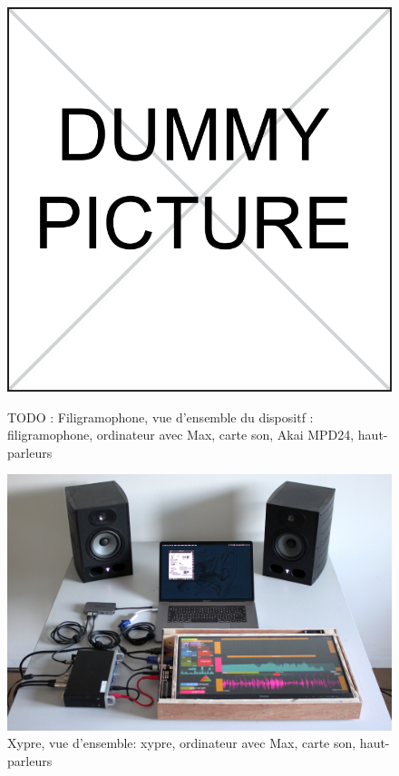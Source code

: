 \begin{figure}[!htbp]
	\captionsetup{format=plain}%
	\centering
	\begin{minipage}[t]{0.48\textwidth}
		\includegraphics[width=\linewidth]{gfx/dummy.pdf}
		\caption[Filigramophone: vue d'ensemble]{TODO : Filigramophone, vue d'ensemble du dispositf : filigramophone, ordinateur avec Max, carte son, Akai MPD24, haut-parleurs}
		\label{fig:interface:filigramophone_unplugged}
	\end{minipage}
	\hspace{.02\linewidth}
	\begin{minipage}[t]{0.48\textwidth}
	    \includegraphics[width=\linewidth]{gfx/05_interfaces/Xypre_Overview_144dpi.jpg}
		\caption[Xypre: vue d'ensemble]{Xypre, vue d'ensemble: xypre, ordinateur avec Max, carte son, haut-parleurs}
		\label{fig:interface:xypre_unplugged}
	\end{minipage}
\end{figure}

